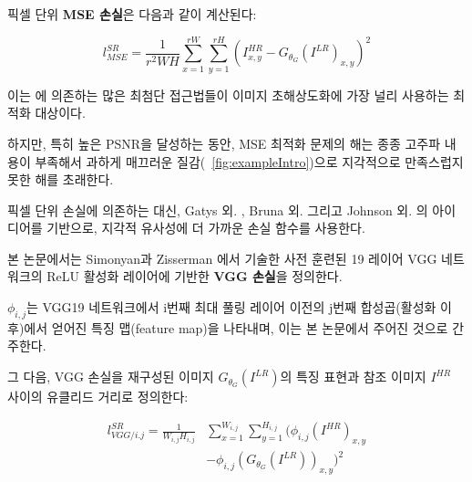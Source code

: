 \documentclass[10pt,twocolumn,letterpaper]{article}
\newcommand{\kor}[1]{#1}
\newcommand{\eng}[1]{}
\begin{document}
\eng{
The pixel-wise \textbf{\ac{MSE} loss} is calculated as:
}\kor{
픽셀 단위 \textbf{\ac{MSE} 손실}은 다음과 같이 계산된다:
}
\begin{equation}
l^{SR}_{MSE} = \frac{1}{r^2WH} \sum_{x=1}^{rW} \sum_{y=1}^{rH} (I^{HR}_{x,y} - G_{\theta_G}(I^{LR})_{x,y})^2
\end{equation}
\eng{
This is the most widely used optimization target for image \ac{SR} on which many state-of-the-art approaches rely \cite{dong2016image,Shi2016ESPCN}.
}\kor{
이는 \cite{dong2016image,Shi2016ESPCN}에 의존하는 많은 최첨단 접근법들이 이미지 \ac{초해상도화}에 가장 널리 사용하는 최적화 대상이다.
} \eng{
However, while achieving particularly high \ac{PSNR}, solutions of \ac{MSE} optimization problems often lack high-frequency content which results in perceptually unsatisfying solutions with overly smooth textures (\cf \figurename~\ref{fig:exampleIntro}).
}\kor{
하지만, 특히 높은 \ac{PSNR}을 달성하는 동안, \ac{MSE} 최적화 문제의 해는 종종 고주파 내용이 부족해서 과하게 매끄러운 질감(\cf \figurename~\ref{fig:exampleIntro})으로 지각적으로 만족스럽지 못한 해를 초래한다.
}

\eng{
Instead of relying on pixel-wise losses we build on the ideas of Gatys et al. \cite{Gatys2015nips}, Bruna et al. \cite{bruna2016super} and Johnson et al. \cite{Johnson16PercepLoss} and use a loss function that is closer to perceptual similarity.
}\kor{
픽셀 단위 손실에 의존하는 대신, Gatys 외. \cite{Gatys2015nips}, Bruna 외. \cite{bruna2016super} 그리고 Johnson 외. \cite{Johnson16PercepLoss}의 아이디어를 기반으로, 지각적 유사성에 더 가까운 손실 함수를 사용한다.
} \eng{
We define the \textbf{VGG loss} based on the ReLU activation layers of the pre-trained 19 layer VGG network described in Simonyan and Zisserman \cite{simonyan2014very}.
}\kor{
본 논문에서는 Simonyan과 Zisserman \cite{simonyan2014very}에서 기술한 사전 훈련된 19 레이어 VGG 네트워크의 ReLU 활성화 레이어에 기반한 \textbf{VGG 손실}을 정의한다.
}\eng{
With $\phi_{i,j}$ we indicate the feature map obtained by the j-th convolution (after activation) before the i-th maxpooling layer within the VGG19 network, which we consider given.
}\kor{
$\phi_{i,j}$는 VGG19 네트워크에서 i번째 최대 풀링 레이어 이전의 j번째 합성곱(활성화 이후)에서 얻어진 특징 맵(feature map)을 나타내며, 이는 본 논문에서 주어진 것으로 간주한다.
}
\eng{
We then define the VGG loss as the euclidean distance between the feature representations of a reconstructed image $G_{\theta_G}(I^{LR})$ and the reference image $I^{HR}$:
}\kor{
그 다음, VGG 손실을 재구성된 이미지 $G_{\theta_G}(I^{LR})$의 특징 표현과 참조 이미지 $I^{HR}$ 사이의 유클리드 거리로 정의한다:
}
\begin{equation}
\begin{split}
l^{SR}_{VGG/i.j} =
\frac{1}{W_{i,j}H_{i,j}} & \sum_{x=1}^{W_{i,j}} \sum_{y=1}^{H_{i,j}} (\phi_{i,j}(I^{HR})_{x,y} \\
& - \phi_{i,j}(G_{\theta_G}(I^{LR}))_{x,y})^2
\end{split}
\label{eq:vgg}
\end{equation}
\end{document}
